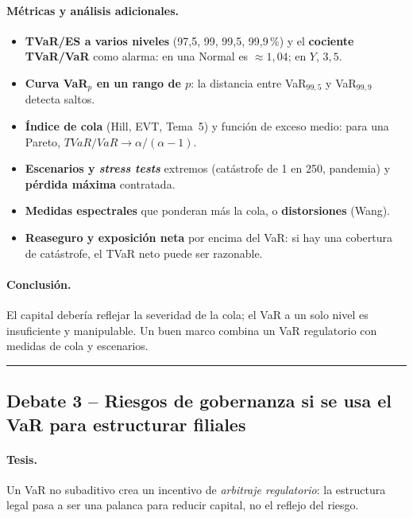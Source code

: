 \documentclass[a4paper,12pt]{article}
\begin{document}
\paragraph{M\'etricas y an\'alisis adicionales.}
\begin{itemize}[leftmargin=*,itemsep=1pt]
\item \textbf{TVaR/ES a varios niveles} (97,5, 99, 99,5, 99,9\,\%) y el \textbf{cociente TVaR/VaR} como alarma: en una Normal es $\approx1{,}04$; en $Y$, $3{,}5$.
\item \textbf{Curva VaR$_p$ en un rango de $p$}: la distancia entre VaR$_{99,5}$ y VaR$_{99,9}$ detecta saltos.
\item \textbf{\'Indice de cola} (Hill, EVT, Tema~5) y funci\'on de exceso medio: para una Pareto, $TVaR/VaR\to\alpha/(\alpha-1)$.
\item \textbf{Escenarios y \emph{stress tests}} extremos (catástrofe de 1 en 250, pandemia) y \textbf{pérdida máxima} contratada.
\item \textbf{Medidas espectrales} que ponderan m\'as la cola, o \textbf{distorsiones} (Wang).
\item \textbf{Reaseguro y exposici\'on neta} por encima del VaR: si hay una cobertura de cat\'astrofe, el TVaR neto puede ser razonable.
\end{itemize}

\paragraph{Conclusi\'on.} El capital deber\'ia reflejar la severidad de la cola; el VaR a un solo nivel es insuficiente y manipulable. Un buen marco combina un VaR regulatorio con medidas de cola y escenarios.

\bigskip\hrule\bigskip

\subsection{Debate 3 -- Riesgos de gobernanza si se usa el VaR para estructurar filiales}

\paragraph{Tesis.} Un VaR no subaditivo crea un incentivo de \emph{arbitraje regulatorio}: la estructura legal pasa a ser una palanca para reducir capital, no el reflejo del riesgo.
\end{document}
